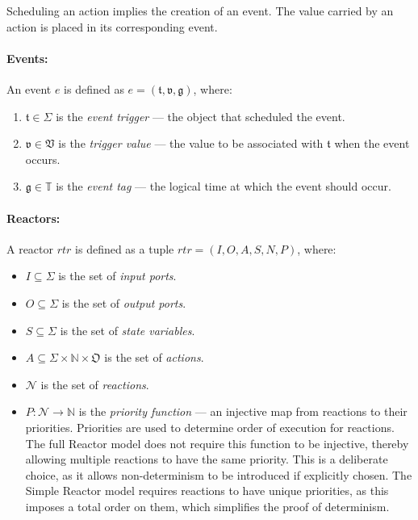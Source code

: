 \noindent Scheduling an action implies the creation of an event.
The value carried by an action is placed in its corresponding event.

\paragraph{Events:} 

An event $e$ is defined as $e = (\mathfrak{t}, \mathfrak{v}, \mathfrak{g})$, where:

\begin{enumerate}
    \item $\mathfrak{t} \in \Sigma$ is the \emph{event trigger} --- the object that scheduled the event.
    \item $\mathfrak{v} \in \mathfrak{V}$ is the \emph{trigger value} --- the value to be associated with $\mathfrak{t}$ when the event occurs.
    \item $\mathfrak{g} \in \mathbb{T}$ is the \emph{event tag} --- the logical time at which the event should occur.
\end{enumerate}

\paragraph{Reactors:}

A reactor $rtr$ is defined as a tuple $rtr = (I, O, A, S, N, P)$, where:

\begin{itemize}
    \item $I \subseteq \Sigma$ is the set of \emph{input ports}.
    \item $O \subseteq \Sigma$ is the set of \emph{output ports}.
    \item $S \subseteq \Sigma$ is the set of \emph{state variables}.
    \item $A \subseteq \Sigma \times \mathbb{N} \times \mathfrak{O}$ is the set of \emph{actions}.
    \item $\mathcal{N}$ is the set of \emph{reactions}.
    \item $P: \mathcal{N} \to \mathbb{N}$ is the \emph{priority function} --- an injective map from reactions to their priorities.
    Priorities are used to determine order of execution for reactions.
    The full Reactor model does not require this function to be injective, thereby allowing multiple reactions to have the same priority.
    This is a deliberate choice, as it allows non-determinism to be introduced if explicitly chosen. 
    The Simple Reactor model requires reactions to have unique priorities, as this imposes a total order on them, which simplifies the proof of determinism.
\end{itemize}

